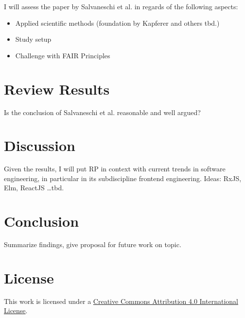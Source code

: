 \documentclass[11pt,a4paper,twocolumn]{article}
\begin{document}
	I will assess the paper by Salvaneschi et al. \cite{7827078} in regards of the following aspects:
	\begin{itemize}
		\item Applied scientific methods (foundation by Kapferer \cite{kapferer:2019:empirical} and others tbd.)
		\item Study setup
		\item Challenge with FAIR Principles \cite{2019arXiv190805986H} \cite{wilkinson:2016}
	\end{itemize}



	\section{Review Results}
	Is the conclusion of Salvaneschi et al. \cite{7827078} reasonable and well argued?



	\section{Discussion}
	Given the results, I will put RP in context with current trends in software engineering, in particular in its subdiscipline frontend engineering.
	Ideas: RxJS, Elm, ReactJS \dots tbd.

	\section{Conclusion}
	Summarize findings, give proposal for future work on topic.

	
	

	\section*{License}
	\ccby\thinspace\thinspace This work is licensed under a \href{https://creativecommons.org/licenses/by/4.0/}{Creative Commons Attribution 4.0 International License}.
\end{document}
